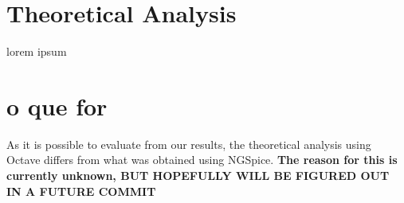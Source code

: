 \section{Theoretical Analysis}
\label{sec:analysis}

lorem ipsum


\section{o que for}

As it is possible to evaluate from our results, the theoretical analysis using Octave differs from what was obtained using NGSpice. \textbf{The reason for this is currently unknown, BUT HOPEFULLY WILL BE FIGURED OUT IN A FUTURE COMMIT}
